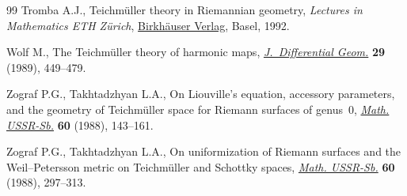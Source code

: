 \documentclass[10pt,a4paper]{amsart}
\numberwithin{equation}{section}
\begin{document}
\begin{thebibliography}{99}
Tromba A.J., Teichm\"uller theory in {R}iemannian geometry, \textit{Lectures in
 Mathematics ETH Z\"urich}, \href{https://doi.org/10.1007/978-3-0348-8613-0}{Birkh\"auser Verlag}, Basel, 1992.

Wolf M., The {T}eichm\"uller theory of harmonic maps, \href{https://doi.org/10.4310/jdg/1214442885}{\textit{J.~Differential
 Geom.}} \textbf{29} (1989), 449--479.

Zograf P.G., Takhtadzhyan L.A., On {L}iouville's equation, accessory parameters, and the geometry of {T}eich\-m\"uller space for {R}iemann surfaces of genus~$0$, \href{https://doi.org/10.1070/SM1988v060n01ABEH003160}{\textit{Math. USSR-Sb.}} \textbf{60} (1988), 143--161.

Zograf P.G., Takhtadzhyan L.A., On uniformization of {R}iemann surfaces and the {W}eil--{P}etersson metric on {T}eichm\"uller and {S}chottky spaces, \href{https://doi.org/10.1070/SM1988v060n02ABEH003170}{\textit{Math. USSR-Sb.}} \textbf{60} (1988), 297--313.

\end{thebibliography}
\end{document}
